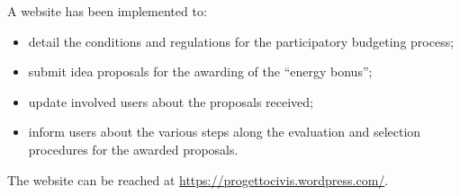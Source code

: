A website has been implemented to:
\begin{itemize}
 \item detail the conditions and regulations for the participatory budgeting process;
 \item submit idea proposals for the awarding of the ``energy bonus'';
 \item update involved users about the proposals received;
 \item inform users about the various steps along the evaluation and selection procedures for the awarded proposals. 
\end{itemize}
The website can be reached at \url{https://progettocivis.wordpress.com/}.

%